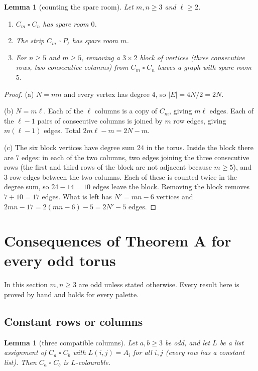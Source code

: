 \documentclass[11pt]{article}
\theoremstyle{plain}
\newtheorem{lemma}[theorem]{Lemma}
\theoremstyle{definition}
\theoremstyle{remark}
\newcommand{\T}{\mathbin{\square}}
\begin{document}
\begin{lemma}[counting the spare room]\label{spare}
Let $m, n \ge 3$ and $\ell \ge 2$.
\begin{enumerate}[label=(\alph*),nosep]
\item $C_m \T C_n$ has spare room $0$.
\item The strip $C_m \T P_\ell$ has spare room $m$.
\item For $n \ge 5$ and $m \ge 5$, removing a $3 \times 2$ block of vertices (three consecutive rows, two consecutive
columns) from $C_m \T C_n$ leaves a graph with spare room $5$.
\end{enumerate}
\end{lemma}

\begin{proof}
(a) $N = mn$ and every vertex has degree 4, so $|E| = 4N/2 = 2N$.

(b) $N = m\ell$. Each of the $\ell$ columns is a copy of $C_m$, giving $m\ell$ edges. Each of the $\ell - 1$ pairs of
consecutive columns is joined by $m$ row edges, giving $m(\ell - 1)$ edges. Total $2m\ell - m = 2N - m$.

(c) The six block vertices have degree sum $24$ in the torus. Inside the block there are $7$ edges: in each of the
two columns, two edges joining the three consecutive rows (the first and third rows of the block are not adjacent
because $m \ge 5$), and $3$ row edges between the two columns. Each of these is counted twice in the degree sum, so
$24 - 14 = 10$ edges leave the block. Removing the block removes $7 + 10 = 17$ edges. What is left has
$N' = mn - 6$ vertices and $2mn - 17 = 2(mn - 6) - 5 = 2N' - 5$ edges.
\end{proof}

\section{Consequences of Theorem A for every odd torus}\label{sec:general}

In this section $m, n \ge 3$ are odd unless stated otherwise. Every result here is proved by hand and holds for
every palette.

\subsection{Constant rows or columns}

\begin{lemma}[three compatible columns]\label{xyz}
Let $a, b \ge 3$ be odd, and let $L$ be a list assignment of $C_a \T C_b$ with $L(i, j) = A_i$ for all $i, j$ (every
row has a constant list). Then $C_a \T C_b$ is $L$-colourable.
\end{lemma}
\end{document}
